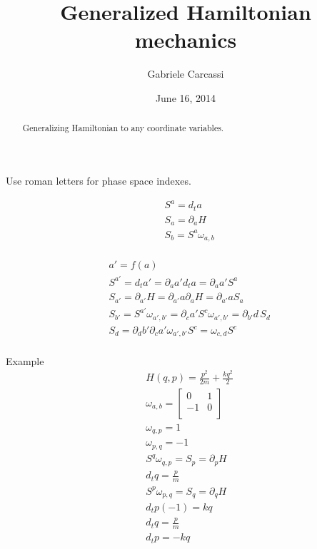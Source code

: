 \documentclass[aps,pra,10pt,twocolumn,floatfix,nofootinbib]{revtex4-1}
\theoremstyle{definition}
\begin{document}
\title{Generalized Hamiltonian mechanics}
\author{Gabriele Carcassi}
\date{June 16, 2014}

\begin{abstract}
Generalizing Hamiltonian to any coordinate variables.\end{abstract}

\maketitle

Use roman letters for phase space indexes.

\begin{align*}
&S^a=d_ta \\
&S_a = \partial_aH \\
&S_b = S^a \omega_{a, b} \\
\end{align*}

\begin{align*}
&a'=f(a) \\
&S^{a'}=d_ta'=\partial_aa'd_ta=\partial_aa'S^a \\
&S_{a'} = \partial_{a'}H = \partial_{a'}a\partial_{a}H = \partial_{a'}aS_a \\
&S_{b'} = S^{a'} \omega_{a', b'} = \partial_ca'S^c \omega_{a', b'} = \partial_{b'}d \, S_d \\
&S_d = \partial_db' \partial_ca' \omega_{a', b'} S^c = \omega_{c, d} S^c \\
\end{align*}

Example
\begin{align*}
&H(q,p) = \frac{p^2}{2m} + \frac{kq^2}{2}  \\
&\omega_{a, b} =  \left[
  \begin{array}{cc}
    0 & 1 \\
    -1 & 0 \\
  \end{array}
\right] \\
&\omega_{q,p} = 1 \\
&\omega_{p,q} = -1 \\
&S^q \omega_{q, p} = S_p = \partial_p H \\
&d_tq = \frac{p}{m} \\
&S^p \omega_{p, q} = S_q = \partial_q H \\
&d_tp (-1) = kq \\
&d_tq = \frac{p}{m} \\
&d_tp = -kq \\
\end{align*}
\end{document}
